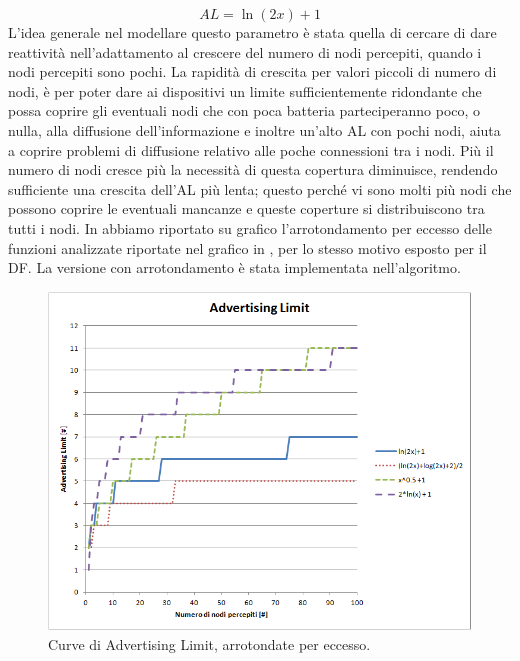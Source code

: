 \begin{equation}
	AL=\ln \left( 2\textit{x}\right) + 1 \nonumber
\end{equation}
L'idea generale nel modellare questo parametro è stata quella di cercare di dare reattività nell'adattamento al crescere del numero di nodi percepiti, quando i nodi percepiti sono pochi. La rapidità di crescita per valori piccoli di numero di nodi, è per poter dare ai  dispositivi un limite sufficientemente ridondante che possa coprire gli eventuali nodi che con poca batteria parteciperanno poco, o nulla, alla diffusione dell'informazione e inoltre un'alto \acs{AL} con pochi nodi, aiuta a coprire problemi di diffusione relativo alle poche connessioni tra i nodi. Più il numero di nodi cresce più la necessità di questa copertura diminuisce, rendendo sufficiente una crescita dell'\acs{AL} più lenta; questo perché vi sono molti più nodi che possono coprire le eventuali mancanze e queste coperture si distribuiscono tra tutti i nodi. In  abbiamo riportato su grafico l'arrotondamento per eccesso delle funzioni analizzate riportate nel grafico in , per lo stesso motivo esposto per il \acs{DF}. La versione con arrotondamento è stata implementata nell'algoritmo.

\begin{figure}[t]
	\centering
	\includegraphics[width=0.9\linewidth]{Images/grafici_usati/AL_curve_arr}
	\caption[Curve dell'AL (arrotondato)]{Curve di Advertising Limit, arrotondate per eccesso.}
	\label{fig:AL_curve_arr}
\end{figure}
